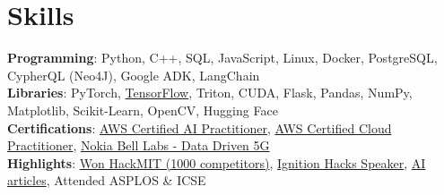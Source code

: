 \documentclass[letterpaper,10pt]{article}
\begin{document}
\section{Skills}
{\small
\textbf{Programming}: Python, C++, SQL, JavaScript, Linux, Docker, PostgreSQL, CypherQL (Neo4J), Google ADK, LangChain\\[2pt]
\textbf{Libraries}: PyTorch, \href{https://www.linkedin.com/in/sachin-ved-gupta/details/certifications/1722045238961/single-media-viewer/?profileId=ACoAAEmlB0MBTKqgxNzZZEh9IbFpWQ42BDEyEgA}{TensorFlow}, Triton, CUDA, Flask, Pandas, NumPy, Matplotlib, Scikit-Learn, OpenCV, Hugging Face\\[2pt]
\textbf{Certifications}: \href{https://www.credly.com/badges/1abae0cc-10fb-4b12-9405-22e4bc9e9b71/linked\_in\_profile}{AWS Certified AI Practitioner}, \href{https://www.credly.com/badges/3606867b-332f-46c2-8517-3a97a1b79989/linked\_in\_profile}{AWS Certified Cloud Practitioner}, \href{https://www.linkedin.com/in/sachin-ved-gupta/details/certifications/1723231554542/single-media-viewer/?profileId=ACoAAEmlB0MBTKqgxNzZZEh9IbFpWQ42BDEyEgA}{Nokia Bell Labs - Data Driven 5G}\\[2pt]
\textbf{Highlights}: \href{https://github.com/SachinVedGupta/Miti}{Won HackMIT (1000 competitors)}, \href{https://drive.google.com/drive/folders/1f-G2-GoIchHc\_OHzt8KHu216W8\_KEb4T?usp=sharing}{Ignition Hacks Speaker}, \href{https://medium.com/@sachinvgupta9}{AI articles}, Attended ASPLOS \& ICSE\\[2pt]
}
\end{document}
